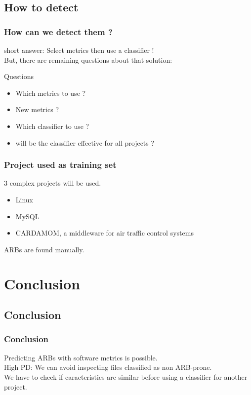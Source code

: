 \documentclass{beamer}
\begin{document}
\subsection{How to detect}
\begin{frame}
 \frametitle{How can we detect them ?}
 short answer: \alert{Select metrics then use a classifier !}\\
 But, there are remaining questions about that solution:\\
 \begin{block}{Questions}
  \begin{itemize}
   \item Which metrics to use ?
   \item New metrics ?
   \item Which classifier to use ?
   \item will be the classifier effective for all projects ?
  \end{itemize}
 \end{block}
\end{frame}

\begin{frame}
 \frametitle{Project used as training set}
 3 complex projects will be used.\\
 \begin{itemize}
  \item Linux
  \item MySQL
  \item CARDAMOM, a middleware for air traffic control systems
 \end{itemize}
 \vspace{0.2cm}
 ARBs are found manually.\\
\end{frame}









\section{Conclusion}
\subsection{Conclusion}
\begin{frame}
 \frametitle{Conclusion}
 Predicting ARBs with software metrics is possible.\\
 \vspace{1cm}
 High PD: We can avoid inspecting files classified as non ARB-prone.\\
 \vspace{1cm}
 We have to check if caracteristics are similar before using a classifier for another project.
\end{frame}
\end{document}
